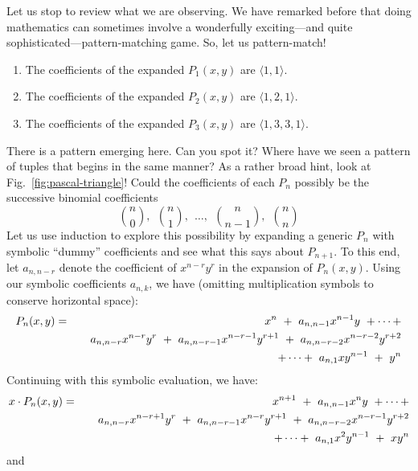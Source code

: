 Let us stop to review what we are observing.  We have remarked before
that doing mathematics can sometimes involve a wonderfully
exciting---and quite sophisticated---pattern-matching game.  So, let
us pattern-match!
\begin{enumerate}
\item
The coefficients of the expanded $P_1(x,y)$ are $\langle 1,1 \rangle$.
\item
The coefficients of the expanded $P_2(x,y)$ are $\langle 1,2,1 \rangle$.
\item
The coefficients of the expanded $P_3(x,y)$ are $\langle 1,3,3,1 \rangle$.
\end{enumerate}
There is a pattern emerging here.  Can you spot it?  Where have we
seen a pattern of tuples that begins in the same manner?  As a rather
broad hint, look at Fig.~\ref{fig:pascal-triangle}!  Could the
coefficients of each $P_n$ possibly be the successive binomial
coefficients
\[ {n \choose 0}, \ \ {n \choose 1}, \ \ \ldots, \ \ {n \choose
  {n-1}}, \ \ {n \choose n}
\]
Let us use induction to explore this possibility by expanding a
generic $P_n$ with symbolic ``dummy'' coefficients and see what this
says about $P_{n+1}$.  To this end, let $a_{n,n-r}$ denote the
coefficient of $x^{n-r} y^r$ in the expansion of $P_n(x,y)$.  Using
our symbolic coefficients $a_{n,k}$, we have (omitting multiplication
symbols to conserve horizontal space):
\begin{eqnarray*}
P_n(x,y) & = &
 x^n \ + \ a_{n,n-1} x^{n-1} y \ + \cdots + \\
         &   & \hspace*{.15in}
a_{n,n-r} x^{n-r} y^r \ + \ a_{n,n-r-1} x^{n-r-1} y^{r+1}
\ + \ a_{n,n-r-2} x^{n-r-2} y^{r+2} \\
         &   & \hspace*{.15in}
+ \cdots + \ a_{n,1} x y^{n-1} \ + \ y^n
\end{eqnarray*}
Continuing with this symbolic evaluation, we have:
\begin{eqnarray}
\nonumber
x \cdot P_n(x,y) & = &
 x^{n+1} \ + \ a_{n,n-1} x^n y \ + \cdots + \\
\nonumber
         &   & \hspace*{.15in}
a_{n,n-r} x^{n-r+1} y^r \ + \ a_{n,n-r-1} x^{n-r} y^{r+1}
\ + \ a_{n,n-r-2} x^{n-r-1} y^{r+2} \\
\label{eq:xPk}
         &   & \hspace*{.15in}
+ \cdots + \ a_{n,1} x^2 y^{n-1} \ + \ x y^n
\end{eqnarray}
and
